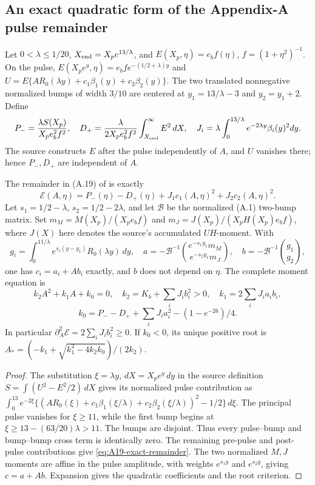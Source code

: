 \subsection*{An exact quadratic form of the Appendix-A pulse remainder}
\label{subsec:exact-A19-quad}
Let $0<\lambda\le1/20$, $X_{\rm end}=X_pe^{13/\lambda}$, and
$E(X_p,\eta)=e_bf(\eta)$, $f=(1+\eta^2)^{-1}$. On the pulse,
$E(X_pe^y,\eta)=e_bf e^{-(1/2+\lambda)y}$ and
$U=E\{AR_0(\lambda y)+c_1\beta_1(y)+c_2\beta_2(y)\}$.
The two translated nonnegative normalized bumps of width $3/10$
are centered at $y_1=13/\lambda-3$ and $y_2=y_1+2$.
Define
\[
P_-=\frac{\lambda S(X_p)}{X_pe_b^2f^2},\quad
D_+=\frac{\lambda}{2X_pe_b^2f^2}\int_{X_{\rm end}}^\infty E^2\,dX,
\quad J_i=\lambda\int_0^{13/\lambda}e^{-2\lambda y}\beta_i(y)^2dy.
\]
The source constructs $E$ after the pulse independently of $A$,
and $U$ vanishes there; hence $P_-,D_+$ are independent of $A$.

\begin{proposition}
\label{prop:source-exact-A19}
The remainder in (A.19) of \cite{openai2026} is exactly
\begin{equation}\label{eq:A19-exact-remainder}
 \mathcal E(A,\eta)=P_-(\eta)-D_+(\eta)+
              J_1c_1(A,\eta)^2+J_2c_2(A,\eta)^2.
\end{equation}
Let $s_1=1/2-\lambda$, $s_2=1/2-2\lambda$,
and let $\mathcal B$ be the normalized (A.1) two-bump matrix.
Set $m_M=M(X_p)/(X_pe_bf)$ and
$m_J=J(X_p)/(X_pH(X_p)e_bf)$, where $J(X)$ here denotes
the source's accumulated $UH$-moment.
With
\[
g_i=\int_0^{11/\lambda}e^{s_i(y-y_1)}R_0(\lambda y)\,dy,\quad
a=-\mathcal B^{-1}\binom{e^{-s_1y_1}m_M}{e^{-s_2y_1}m_J},
\quad b=-\mathcal B^{-1}\binom{g_1}{g_2},
\]
one has $c_i=a_i+A b_i$ exactly, and $b$ does not depend on $\eta$.
The complete moment equation is
\[
k_2A^2+k_1A+k_0=0,\quad
k_2=K_b+\sum_iJ_ib_i^2>0,\quad k_1=2\sum_iJ_ia_ib_i,
\]
\[
k_0=P_--D_++\sum_iJ_ia_i^2-(1-e^{-26})/4.
\]
In particular $\partial_A^2\mathcal E=2\sum_iJ_ib_i^2\ge0$.
If $k_0<0$, its unique positive root is
$A_*=(-k_1+\sqrt{k_1^2-4k_2k_0})/(2k_2)$.
\end{proposition}
\begin{proof}
The substitution $\xi=\lambda y$, $dX=X_pe^y\,dy$ in the
source definition $S=\int(U^2-E^2/2)\,dX$ gives its
normalized pulse contribution as
$\int_0^{13}e^{-2\xi}\{(AR_0(\xi)+c_1\beta_1(\xi/\lambda)
+c_2\beta_2(\xi/\lambda))^2-1/2\}\,d\xi$.
The principal pulse vanishes for $\xi\ge11$, while the
first bump begins at $\xi\ge13-(63/20)\lambda>11$.
The bumps are disjoint. Thus every pulse--bump and
bump--bump cross term is identically zero. The remaining
pre-pulse and post-pulse contributions give
\eqref{eq:A19-exact-remainder}. The two normalized $M,J$
moments are affine in the pulse amplitude, with weights
$e^{s_1y}$ and $e^{s_2y}$, giving $c=a+Ab$.
Expansion gives the quadratic coefficients and the root criterion.
\end{proof}

